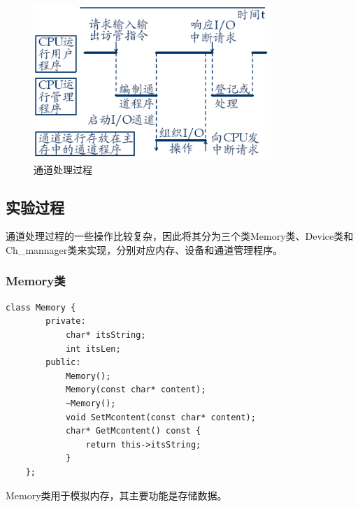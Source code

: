 \documentclass[UTF8,12pt]{article}
\begin{document}
\begin{figure}[htbp]
    \centering
    \includegraphics[width=0.8\textwidth]{imgs/6.png}
    \caption{通道处理过程}
\end{figure}

\subsection{实验过程}
通道处理过程的一些操作比较复杂，因此将其分为三个类Memory类、Device类和Ch\_mannager类来实现，分别对应内存、设备和通道管理程序。

\subsubsection{Memory类}
\begin{lstlisting}[frame=shadowbox] 
    class Memory {
        private:
            char* itsString;
            int itsLen;
        public:
            Memory();
            Memory(const char* content);
            ~Memory();
            void SetMcontent(const char* content);
            char* GetMcontent() const {
                return this->itsString;
            }
    };
\end{lstlisting}

Memory类用于模拟内存，其主要功能是存储数据。
\end{document}
